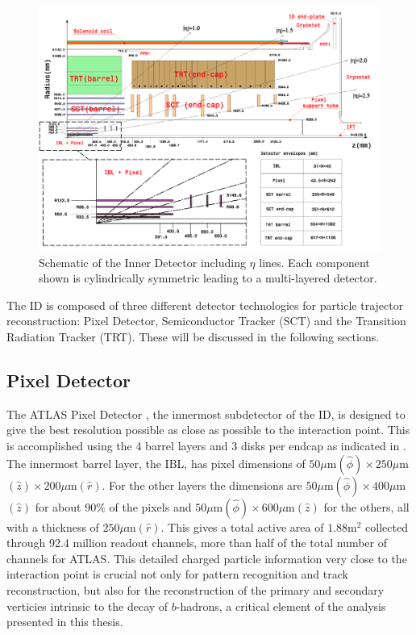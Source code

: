\begin{figure}[!htbp]
  \begin{center}
    \includegraphics[width=0.8\linewidth]{figures/atlas/inner_detector_schematic}
    \caption{ \cite{PIX-2018-001} Schematic of the Inner Detector including $\eta$
lines.  Each component shown is cylindrically symmetric leading to a
multi-layered detector.}
    \label{fig:inner_detector_schematic}
  \end{center}
\end{figure}

The ID is composed of three different detector technologies for particle
trajector reconstruction: Pixel Detector, Semiconductor Tracker (SCT) and
the Transition Radiation Tracker (TRT).  These will be discussed in the
following sections. 

\subsection{Pixel Detector}

The ATLAS Pixel Detector \cite{PERF-2007-01}, the innermost subdetector of the ID, is designed to
give the best resolution possible as close as possible to the interaction point.
This is accomplished using the 4 barrel layers and 3 disks per endcap as
indicated in . The innermost barrel
layer, the IBL, has pixel dimensions of $50\mu $m$(\hat{\phi}) \times 250\mu $m$
(\hat{z}) \times 200\mu $m$(\hat{r})$.  For the other layers the dimensions are
$50\mu $m$(\hat{\phi}) \times 400\mu $m$(\hat{z})$ for about $90\%$ of the pixels
and $50\mu $m$(\hat{\phi}) \times 600\mu $m$(\hat{z})$ for the others, all with a
thickness of $250\mu $m$(\hat{r})$.  This gives a total active area of $1.88 $m$^2$
collected through 92.4 million readout channels, more than half of the total
number of channels for ATLAS. This detailed charged particle information very
close to the interaction point is crucial not only for pattern recognition and
track reconstruction, but also for the reconstruction of the primary and
secondary verticies intrinsic to the decay of $b$-hadrons, a critical element
of the analysis presented in this thesis.

